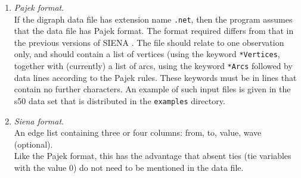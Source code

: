 \documentclass[a4paper,fleqn]{article}
\newcommand{\+}{\, + \,}
\newcommand{\SI}{{\sf SIENA }}
\newcommand{\si}{{\sf SIENA}}
\begin{document}
{\begin{enumerate}
      Although this section talks only about digraphs (directed graphs), it is
      also possible that all observed adjacency matrices are symmetric.
      This will be automatically detected by \si, and
      the program will then utilize methods for non-directed networks.

      The data matrices for the digraphs
       must be coded in the sense
      that their values are converted by the program to the 0 and 1
      entries in the adjacency matrix. A set of code numbers is required
      for each digraph data matrix; these codes are regarded as the
      numbers representing a present arc in the digraph, i.e., a 1 entry
      in the adjacency matrix; all other numbers will be regarded as 0
      entries in the adjacency matrix. Of course, there must be at least
      one such code number. All code numbers must be in the range from 0
      to 9, except for structurally determined values (see below).

      This implies that if the data are already in 0-1 format, the
      single code number 1 must be given. As another example, if the
      data matrix contains values 1 to 5 and only the values 4 and 5 are
      to be interpreted as present arcs, then the code numbers 4 and 5
      must be given.
    \item \emph{Pajek format}.\\
      If the digraph data file has extension name \texttt{.net}, then the
      program assumes that the data file has Pajek format.  The format required
      differs from that in the previous versions of \SI.  The file should relate
      to one observation only, and should contain a list of vertices (using the
      keyword \texttt{*Vertices}, together with (currently) a list of arcs,
      using the keyword \texttt{*Arcs}
      followed by data lines according to the Pajek rules.
      These keywords must be in lines that contain no further characters.
      An example of such input files is given in the s50 data set
      that is distributed in the \texttt{examples} directory.
    \item \emph{Siena format}.\\
      An edge list containing three or four columns:
      from, to, value, wave (optional).\\
      Like the Pajek format, this has the advantage that absent ties
      (tie variables with the value 0) do not need to be mentioned
      in the data file.
\end{enumerate}

}
\end{document}
